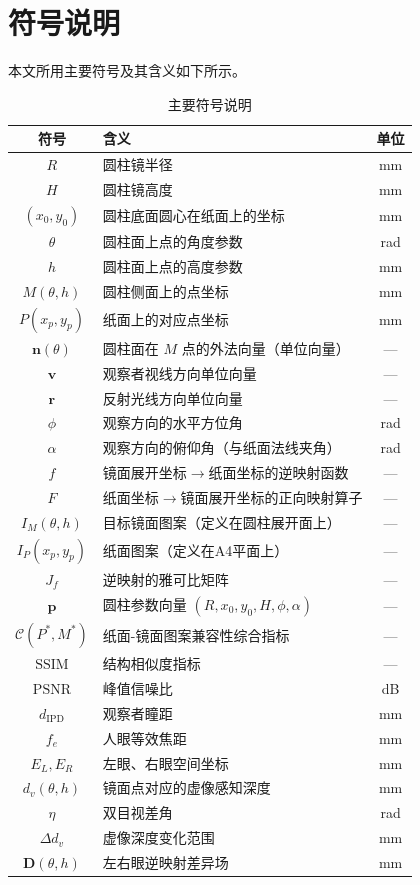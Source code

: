 \clearpage
\section{符号说明}

本文所用主要符号及其含义如下所示。

\begin{table}[H]
\centering
\caption{主要符号说明}\label{tab:symbols}
\begin{tabular}{clc}
\toprule
符号 & 含义 & 单位\\
\midrule
$R$ & 圆柱镜半径 & mm\\
$H$ & 圆柱镜高度 & mm\\
$(x_0, y_0)$ & 圆柱底面圆心在纸面上的坐标 & mm\\
$\theta$ & 圆柱面上点的角度参数 & rad\\
$h$ & 圆柱面上点的高度参数 & mm\\
$M(\theta, h)$ & 圆柱侧面上的点坐标 & mm\\
$P(x_p, y_p)$ & 纸面上的对应点坐标 & mm\\
$\boldsymbol{n}(\theta)$ & 圆柱面在 $M$ 点的外法向量（单位向量） & —\\
$\boldsymbol{v}$ & 观察者视线方向单位向量 & —\\
$\boldsymbol{r}$ & 反射光线方向单位向量 & —\\
$\phi$ & 观察方向的水平方位角 & rad\\
$\alpha$ & 观察方向的俯仰角（与纸面法线夹角） & rad\\
$f$ & 镜面展开坐标$\rightarrow$纸面坐标的逆映射函数 & —\\
$F$ & 纸面坐标$\rightarrow$镜面展开坐标的正向映射算子 & —\\
$I_M(\theta, h)$ & 目标镜面图案（定义在圆柱展开面上） & —\\
$I_P(x_p, y_p)$ & 纸面图案（定义在A4平面上） & —\\
$J_f$ & 逆映射的雅可比矩阵 & —\\
$\boldsymbol{p}$ & 圆柱参数向量 $(R, x_0, y_0, H, \phi, \alpha)$ & —\\
$\mathcal{C}(P^*, M^*)$ & 纸面-镜面图案兼容性综合指标 & —\\
$\text{SSIM}$ & 结构相似度指标 & —\\
$\text{PSNR}$ & 峰值信噪比 & dB\\
$d_{\text{IPD}}$ & 观察者瞳距 & mm\\
$f_e$ & 人眼等效焦距 & mm\\
$E_L, E_R$ & 左眼、右眼空间坐标 & mm\\
$d_v(\theta,h)$ & 镜面点对应的虚像感知深度 & mm\\
$\eta$ & 双目视差角 & rad\\
$\Delta d_v$ & 虚像深度变化范围 & mm\\
$\boldsymbol{D}(\theta,h)$ & 左右眼逆映射差异场 & mm\\
\bottomrule
\end{tabular}
\end{table}
